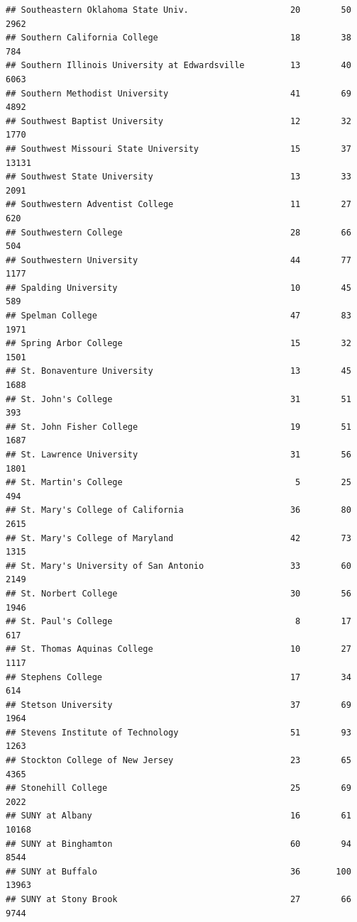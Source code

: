 \documentclass[
]{article}
\begin{document}
\begin{verbatim}
## Southeastern Oklahoma State Univ.                    20        50        2962
## Southern California College                          18        38         784
## Southern Illinois University at Edwardsville         13        40        6063
## Southern Methodist University                        41        69        4892
## Southwest Baptist University                         12        32        1770
## Southwest Missouri State University                  15        37       13131
## Southwest State University                           13        33        2091
## Southwestern Adventist College                       11        27         620
## Southwestern College                                 28        66         504
## Southwestern University                              44        77        1177
## Spalding University                                  10        45         589
## Spelman College                                      47        83        1971
## Spring Arbor College                                 15        32        1501
## St. Bonaventure University                           13        45        1688
## St. John's College                                   31        51         393
## St. John Fisher College                              19        51        1687
## St. Lawrence University                              31        56        1801
## St. Martin's College                                  5        25         494
## St. Mary's College of California                     36        80        2615
## St. Mary's College of Maryland                       42        73        1315
## St. Mary's University of San Antonio                 33        60        2149
## St. Norbert College                                  30        56        1946
## St. Paul's College                                    8        17         617
## St. Thomas Aquinas College                           10        27        1117
## Stephens College                                     17        34         614
## Stetson University                                   37        69        1964
## Stevens Institute of Technology                      51        93        1263
## Stockton College of New Jersey                       23        65        4365
## Stonehill College                                    25        69        2022
## SUNY at Albany                                       16        61       10168
## SUNY at Binghamton                                   60        94        8544
## SUNY at Buffalo                                      36       100       13963
## SUNY at Stony Brook                                  27        66        9744

\end{verbatim}
\end{document}
